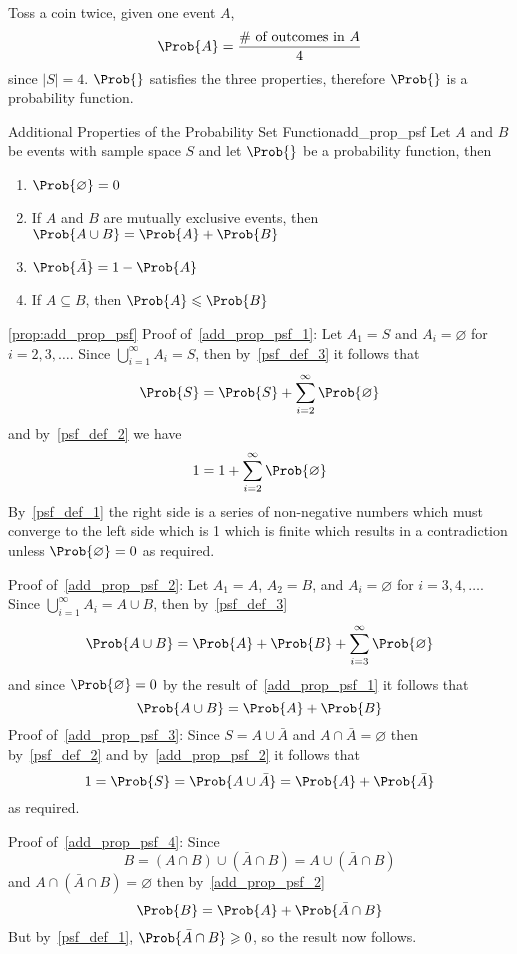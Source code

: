 \begin{Example}{}{}
    Toss a coin twice, given one event $ A $,
    \[ \Prob{A}=\frac{\text{\# of outcomes in }A}{4}  \]
    since $ |S|= 4 $. $ \Prob{} $ satisfies the three properties,
    therefore $ \Prob{} $ is a probability function.
\end{Example}

\begin{Proposition}{Additional Properties of the Probability Set Function}{add_prop_psf}
    Let $ A $ and $ B $ be events with sample space $ S $
    and let $ \Prob{} $ be a probability function, then
    \begin{enumerate}[label=(\arabic*)]
        \item\label{add_prop_psf_1} $ \Prob{\varnothing}=0 $
        \item\label{add_prop_psf_2} If $ A $ and $ B $ are mutually exclusive events, then $ \Prob{A\cup B}=\Prob{A}+\Prob{B} $
        \item\label{add_prop_psf_3} $ \Prob{\bar{A}}=1-\Prob{A} $
        \item\label{add_prop_psf_4} If $ A\subseteq B $, then $ \Prob{A}\leqslant \Prob{B} $
    \end{enumerate}
\end{Proposition}
\begin{Proof}{\ref{prop:add_prop_psf}}{}
    Proof of~\ref{add_prop_psf_1}: Let $ A_1=S $ and $ A_i=\varnothing $ for $ i=2,3,\ldots $.
    Since $ \bigcup\limits_{i=1}^{\infty}A_i=S $, then by~\ref{psf_def_3}
    it follows that
    \[ \Prob{S}=\Prob{S}+\sum\limits_{i=2}^{\infty} \Prob{\varnothing} \]
    and by~\ref{psf_def_2} we have
    \[ 1=1+\sum\limits_{i=2}^{\infty}\Prob{\varnothing} \]
    By~\ref{psf_def_1} the right side is a series of non-negative numbers which must converge to
    the left side which is 1 which is finite which results in a contradiction
    unless $ \Prob{\varnothing}=0 $ as required.

    Proof of~\ref{add_prop_psf_2}: Let $ A_1=A $, $ A_2=B $, and $ A_i=\varnothing $ for
    $ i=3,4,\ldots $. Since $ \bigcup\limits_{i=1}^\infty A_i=A\cup B $, then by~\ref{psf_def_3}
    \[ \Prob{A\cup B}=\Prob{A}+\Prob{B}+\sum\limits_{i=3}^{\infty} \Prob{\varnothing} \]
    and since $ \Prob{\varnothing}=0 $ by the result of~\ref{add_prop_psf_1} it follows that
    \[ \Prob{A\cup B}=\Prob{A}+\Prob{B} \]
    Proof of~\ref{add_prop_psf_3}: Since $ S=A\cup \bar{A} $ and $ A\cap \bar{A}=\varnothing $
    then by~\ref{psf_def_2} and by~\ref{add_prop_psf_2} it follows that
    \[ 1=\Prob{S}=\Prob{A\cup\bar{A}}=\Prob{A}+\Prob{\bar{A}} \]
    as required.

    Proof of~\ref{add_prop_psf_4}: Since
    \[ B=(A\cap B)\cup (\bar{A}\cap B)=A\cup(\bar{A}\cap B) \]
    and $ A\cap(\bar{A}\cap B)=\varnothing $ then by~\ref{add_prop_psf_2}
    \[ \Prob{B}=\Prob{A}+\Prob{\bar{A}\cap B} \]
    But by~\ref{psf_def_1}, $ \Prob{\bar{A}\cap B}\geqslant 0 $, so the result now follows.
\end{Proof}

